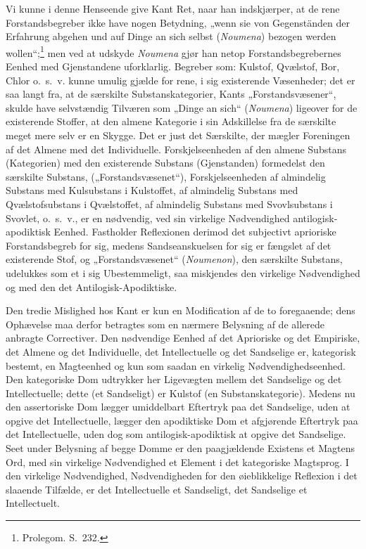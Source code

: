 \documentclass[12pt]{book}
\newcommand{\opage}[1]{\marginnote{\footnotesize\textit{[#1]}}}
\begin{document}
Vi kunne i denne Henseende give Kant Ret, naar han
indskjærper, at de rene Forstandsbegreber ikke have nogen Betydning,
„wenn sie von Gegenständen der Erfahrung abgehen
und auf Dinge an sich selbst (\textit{Noumena}) bezogen werden
wollen“;\footnote{Prolegom. S.~232.}%
{} men ved at udskyde \textit{Noumena} gjør han netop
Forstandsbegrebernes Eenhed med Gjenstandene uforklarlig.
Begreber som: Kulstof, Qvælstof, Bor, Chlor o.\ s.\ v. kunne
umulig gjælde for rene, i sig existerende Væsenheder; det er
saa langt fra, at de særskilte Substanskategorier, Kants „Forstandsvæsener“,
skulde have selvstændig Tilværen som „Dinge an
sich“ (\textit{Noumena}) ligeover for de existerende Stoffer, at den almene
Kategorie i sin Adskillelse fra de særskilte meget mere
selv er en Skygge. Det er just det Særskilte, der mægler
\opage{274}Foreningen af det Almene med det Individuelle. Forskjelseenheden
af den almene Substans (Kategorien) med den existerende
Substans (Gjenstanden) formedelst den særskilte Substans,
(„Forstandsvæsenet“), Forskjelseenheden af almindelig Substans
med Kulsubstans i Kulstoffet, af almindelig Substans med
Qvælstofsubstans i Qvælstoffet, af almindelig Substans med
Svovlsubstans i Svovlet, o.\ s.\ v., er en nødvendig, ved sin
virkelige Nødvendighed antilogisk-apodiktisk Eenhed. Fastholder
Reflexionen derimod det subjectivt aprioriske Forstandsbegreb
for sig, medens Sandseanskuelsen for sig er fængslet af det
existerende Stof, og „Forstandsvæsenet“ (\textit{Noumenon}), den
særskilte Substans, udelukkes som et i sig Ubestemmeligt, saa
miskjendes den virkelige Nødvendighed og med den det Antilogisk-Apodiktiske.

Den tredie Mislighed hos Kant er kun en Modification
af de to foregaaende; dens Ophævelse maa derfor betragtes
som en nærmere Belysning af de allerede anbragte Correctiver.
Den nødvendige Eenhed af det Aprioriske og det Empiriske,
det Almene og det Individuelle, det Intellectuelle og
det Sandselige er, kategorisk bestemt, en Magteenhed og kun
som saadan en virkelig Nødvendighedseenhed. Den kategoriske
Dom udtrykker her Ligevægten mellem det Sandselige og det
Intellectuelle; dette (et Sandseligt) er Kulstof (en Substanskategorie).
Medens nu den assertoriske Dom lægger umiddelbart
Eftertryk paa det Sandselige, uden at opgive det Intellectuelle,
lægger den apodiktiske Dom et afgjørende Eftertryk
paa det Intellectuelle, uden dog som antilogisk-apodiktisk at
opgive det Sandselige. Seet under Belysning af begge Domme
er den paagjældende Existens et Magtens Ord, med sin virkelige
Nødvendighed et Element i det kategoriske Magtsprog.
I den virkelige Nødvendighed, Nødvendigheden for den øieblikkelige
Reflexion i det slaaende Tilfælde, er det Intellectuelle
et Sandseligt, det Sandselige et Intellectuelt.
\end{document}
